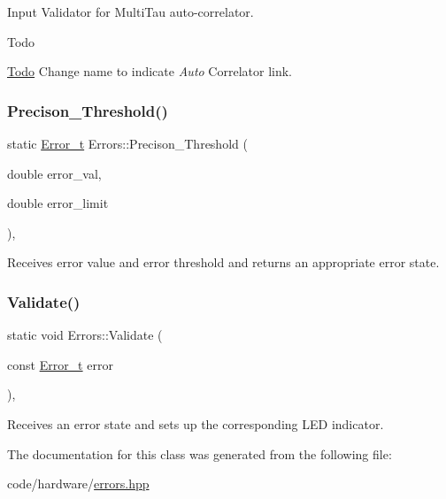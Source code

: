 Input Validator for Multi\+Tau auto-\/correlator. 

\begin{DoxyRefDesc}{Todo}
\item[\hyperlink{todo__todo000002}{Todo}]Change name to indicate {\itshape Auto} Correlator link. \end{DoxyRefDesc}
\mbox{\label{classErrors_a1568635c69e70e2422a5a632d8d6809d}} 
\subsubsection{\texorpdfstring{Precison\+\_\+\+Threshold()}{Precison\_Threshold()}}
{\footnotesize\ttfamily static \hyperlink{errors_8hpp_a4e8c0d09726859e3d3369c0da5a1aa7f}{Error\+\_\+t} Errors\+::\+Precison\+\_\+\+Threshold (\begin{DoxyParamCaption}\item[{double}]{error\+\_\+val,  }\item[{double}]{error\+\_\+limit }\end{DoxyParamCaption})\hspace{0.3cm}{\ttfamily [inline]}, {\ttfamily [static]}}



Receives error value and error threshold and returns an appropriate error state. 

\mbox{\label{classErrors_a9e43e14a2d0834f192b954cce71c387b}} 
\subsubsection{\texorpdfstring{Validate()}{Validate()}}
{\footnotesize\ttfamily static void Errors\+::\+Validate (\begin{DoxyParamCaption}\item[{const \hyperlink{errors_8hpp_a4e8c0d09726859e3d3369c0da5a1aa7f}{Error\+\_\+t}}]{error }\end{DoxyParamCaption})\hspace{0.3cm}{\ttfamily [inline]}, {\ttfamily [static]}}



Receives an error state and sets up the corresponding L\+ED indicator. 



The documentation for this class was generated from the following file\+:\begin{DoxyCompactItemize}
\item 
code/hardware/\hyperlink{errors_8hpp}{errors.\+hpp}\end{DoxyCompactItemize}
